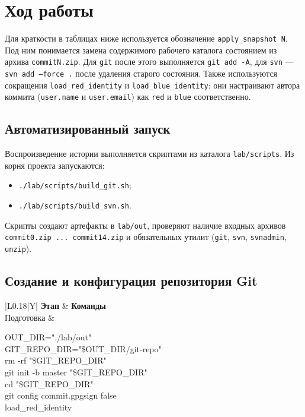 \documentclass[12pt]{article}
\newcommand{\cmdcell}[1]{\parbox[t]{\linewidth}{\ttfamily\small\raggedright\strut #1\strut}}
\begin{document}
\section{Ход работы}

Для краткости в таблицах ниже используется обозначение
\texttt{apply\_snapshot N}. Под ним понимается замена содержимого рабочего
каталога состоянием из архива \texttt{commitN.zip}.
Для \texttt{git} после этого выполняется \texttt{git add -A}, для
\texttt{svn} --- \texttt{svn add --force .} после удаления старого состояния.
Также используются сокращения \texttt{load\_red\_identity} и
\texttt{load\_blue\_identity}: они настраивают автора коммита
(\texttt{user.name} и \texttt{user.email}) как \texttt{red} и
\texttt{blue} соответственно.

\subsection{Автоматизированный запуск}

Воспроизведение истории выполняется скриптами из каталога
\texttt{lab/scripts}. Из корня проекта запускаются:

\begin{itemize}[leftmargin=1.5em]
    \item \texttt{./lab/scripts/build\_git.sh};
    \item \texttt{./lab/scripts/build\_svn.sh}.
\end{itemize}

Скрипты создают артефакты в \texttt{lab/out}, проверяют наличие входных
архивов \texttt{commit0.zip ... commit14.zip} и обязательных утилит
(\texttt{git}, \texttt{svn}, \texttt{svnadmin}, \texttt{unzip}).

\subsection{Создание и конфигурация репозитория Git}

\noindent
\begin{tabularx}{\textwidth}{|L{0.18\textwidth}|Y|}
\hline
{}
\textbf{Этап} & \textbf{Команды} \\
\hline
Подготовка &
\cmdcell{OUT\_DIR="./lab/out"\\
GIT\_REPO\_DIR="\$OUT\_DIR/git-repo"\\
rm -rf "\$GIT\_REPO\_DIR"\\
git init -b master "\$GIT\_REPO\_DIR"\\
cd "\$GIT\_REPO\_DIR"\\
git config commit.gpgsign false\\
load\_red\_identity} \\
\hline
\end{tabularx}
\end{document}
